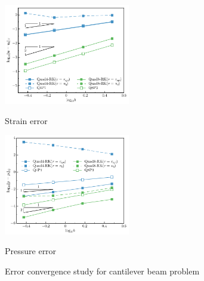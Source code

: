 \begin{figure}[H]
\centering
\begin{subcaptiongroup}
\centering
\parbox[b]{0.49\textwidth}{
    \includegraphics[width=0.49\textwidth]{pdf/cantilever_Hdev.pdf}
    \caption{Strain error}\label{fg:cantilever_convergence_strain}
}
\parbox[b]{0.49\textwidth}{
    \includegraphics[width=0.49\textwidth]{pdf/cantilever_L2_p.pdf}
    \caption{Pressure error}\label{fg:cantilever_convergence_pressure}
}
\end{subcaptiongroup}
\caption{Error convergence study for cantilever beam problem}\label{fg:cantilever_convergence}
\end{figure}

